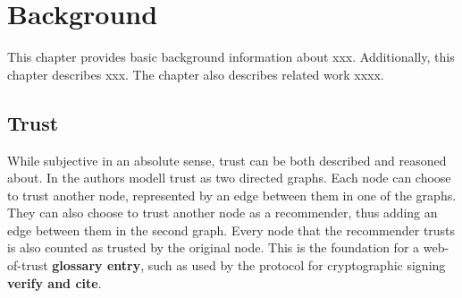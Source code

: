 \documentclass[english, biblatex, digitaloutput]{kththesis}
\begin{document}
\cleardoublepage
\chapter{Background}
\label{ch:background}


This chapter provides basic background information about xxx. Additionally, this chapter describes xxx. The chapter also describes related work xxxx.




\section{Trust}

While subjective in an absolute sense, trust can be both described and reasoned about. In \cite{abdui-rahman_distributed_nodate} the authors modell trust as two directed graphs. Each node can choose to trust another node, represented by an edge between them in one of the graphs. They can also choose to trust another node as a recommender, thus adding an edge between them in the second graph. Every node that the recommender trusts is also counted as trusted by the original node. This is the foundation for a web-of-trust \textbf{glossary entry}, such as used by the  protocol for cryptographic signing \textbf{verify and cite}.
\end{document}
